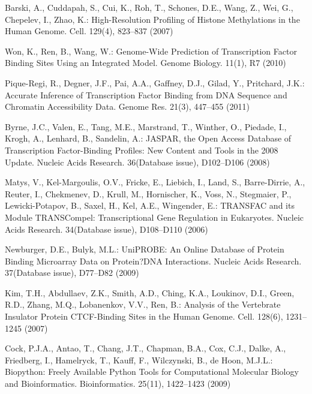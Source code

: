 \documentclass[runningheads,a4paper]{llncs}
\begin{document}
\begin{thebibliography}{4}
 Barski, A., Cuddapah, S., Cui, K., Roh, T., Schones, D.E., Wang, Z., Wei, G., Chepelev, I., Zhao, K.: High-Resolution Profiling of Histone Methylations in the Human Genome. Cell. 129(4), 823--837 (2007)

 Won, K., Ren, B., Wang, W.: Genome-Wide Prediction of Transcription Factor Binding Sites Using an Integrated Model. Genome Biology. 11(1), R7 (2010)

 Pique-Regi, R., Degner, J.F., Pai, A.A., Gaffney, D.J., Gilad, Y., Pritchard, J.K.: Accurate Inference of Transcription Factor Binding from DNA Sequence and Chromatin Accessibility Data. Genome Res. 21(3), 447--455 (2011)

 Byrne, J.C., Valen, E., Tang, M.E., Marstrand, T., Winther, O., Piedade, I., Krogh, A., Lenhard, B., Sandelin, A.: JASPAR, the Open Access Database of Transcription Factor-Binding Profiles: New Content and Tools in the 2008 Update. Nucleic Acids Research. 36(Database issue), D102--D106 (2008)

 Matys, V., Kel-Margoulis, O.V., Fricke, E., Liebich, I., Land, S., Barre-Dirrie, A., Reuter, I., Chekmenev, D., Krull, M., Hornischer, K., Voss, N., Stegmaier, P., Lewicki-Potapov, B., Saxel, H., Kel, A.E., Wingender, E.: TRANSFAC and its Module TRANSCompel: Transcriptional Gene Regulation in Eukaryotes. Nucleic Acids Research. 34(Database issue), D108--D110 (2006)

 Newburger, D.E., Bulyk, M.L.: UniPROBE: An Online Database of Protein Binding Microarray Data on Protein?DNA Interactions. Nucleic Acids Research. 37(Database issue), D77--D82 (2009)

 Kim, T.H., Abdullaev, Z.K., Smith, A.D., Ching, K.A., Loukinov, D.I., Green, R.D., Zhang, M.Q., Lobanenkov, V.V., Ren, B.: Analysis of the Vertebrate Insulator Protein CTCF-Binding Sites in the Human Genome. Cell. 128(6), 1231--1245 (2007)

 Cock, P.J.A., Antao, T., Chang, J.T., Chapman, B.A., Cox, C.J., Dalke, A., Friedberg, I., Hamelryck, T., Kauff, F., Wilczynski, B., de Hoon, M.J.L.: Biopython: Freely Available Python Tools for Computational Molecular Biology and Bioinformatics. Bioinformatics. 25(11), 1422--1423 (2009)


\end{thebibliography}
\end{document}

